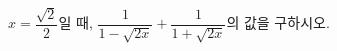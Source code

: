 \hspace*{2mm}\begin{minipage}[t]{\dimexpr\linewidth-2mm\relax}\vspace{0pt}
$x=\dfrac{\sqrt{2}}{2}$일 때, $\dfrac{1}{1-\sqrt{2x}}+\dfrac{1}{1+\sqrt{2x}}$의 값을 구하시오.\end{minipage}
